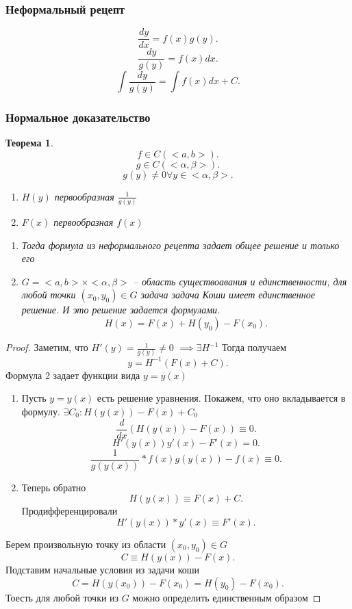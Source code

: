 \documentclass[14pt]{extarticle}
\newtheorem{theorem}{Теорема}
\begin{document}
\subsubsection{Неформальный рецепт}
\[
	\frac{dy}{dx} = f(x)g(y)
	.\]
\[
	\frac{dy}{g(y)} = f(x) dx
	.\]
\[
	\int \frac{dy}{g(y)} = \int f(x) dx + C
	.\]
\subsubsection{Нормальное доказательство}
\begin{theorem}
	\[
		f \in C(<a,b>)
		.\]
	\[
		g \in C(<\alpha,\beta>)
		.\]
	\[
		g(y) \neq 0 \forall  y \in <\alpha,\beta>
		.\]
	\begin{enumerate}
		\item $H(y) $ первообразная $\frac{1}{g(y)}$
		\item $F(x)$ первообразная  $f(x)$
	\end{enumerate}
	\begin{enumerate}
		\item Тогда формула из неформального рецепта задает общее решение  и только его
		\item $G = <a,b> \times <\alpha,\beta>$ -- область существоавания и единственности, для любой точки  $(x_0,y_0) \in G$ задача задача Коши имеет единственное решение.
		      И это решение задается формулами.
		      \[
			      H(x) = F(x) + H(y_0) - F(x_0)
			      .\]
	\end{enumerate}
\end{theorem}
\begin{proof}
	Заметим, что  $H'(y) = \frac{1}{g(y)} \neq 0$ $\implies \exists  H^{-1}$
	Тогда получаем
	\[
		y = H^{-1} (F(x) + C)
		.\]
	Формула 2 задает функции вида $y  = y(x)$
	\begin{enumerate}
		\item  Пусть $y = y(x)$ есть решение уравнения. Покажем, что оно вкладывается в формулу.  $\exists  C_0 : H(y(x)) - F(x) + C_0$
		      \[
			      \frac{d}{dx} (H(y(x)) - F(x)) \equiv 0
			      .\]
		      \[
			      H'(y(x)) y'(x) - F'(x) = 0
			      .\]
		      \[
			      \frac{1}{g(y(x))} * f(x) g(y(x)) - f(x) \equiv 0
			      .\]
		\item Теперь обратно
		      \[
			      H(y(x)) \equiv F(x) + C
			      .\]
		      Продифференцировали
		      \[
			      H'(y(x)) * y'(x) \equiv F'(x)
			      .\]
	\end{enumerate}
	Берем произвольную точку из области $(x_0,y_0) \in G$
	\[
		C \equiv H(y(x)) - F(x)
		.\]
	Подставим начальные условия из задачи коши
	\[
		C = H(y(x_0)) - F(x_0) = H(y_0) - F (x_0)
		.\]
	Тоесть для любой точки из $G$ можно определить единственным образом
\end{proof}
\end{document}
